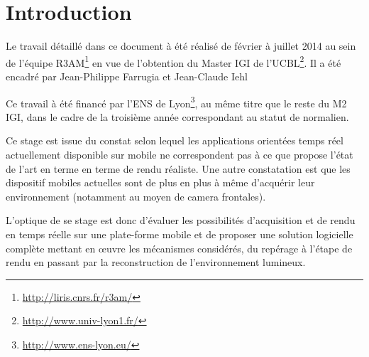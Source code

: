 \documentclass[10pt,a4paper,twoside, twocolumn]{report}
\newcommand*{\rootPath}{../}
\begin{document}
{}
\chapter*{Introduction}

Le travail détaillé dans ce document à été réalisé de février à juillet 2014 au sein de l'équipe R3AM\footnote{\url{http://liris.cnrs.fr/r3am/}} en vue de l’obtention du Master IGI de l'UCBL\footnote{\url{http://www.univ-lyon1.fr/}}. Il a été encadré par Jean-Philippe Farrugia et Jean-Claude Iehl

Ce travail à été financé par l'ENS de Lyon\footnote{\url{http://www.ens-lyon.eu/}}, au même titre que le reste du M2 IGI, dans le cadre de la troisième année correspondant au statut de normalien.

Ce stage est issue du constat selon lequel les applications orientées temps réel actuellement disponible sur mobile ne correspondent pas à ce que propose l'état de l'art en terme en terme de rendu réaliste. Une autre constatation est que les dispositif mobiles actuelles sont de plus en plus à même d’acquérir leur environnement (notamment au moyen de camera frontales).

L'optique de se stage est donc d'évaluer les possibilités d'acquisition et de rendu en temps réelle sur une plate-forme mobile et de proposer une solution logicielle complète mettant en œuvre les mécanismes considérés, du repérage à l'étape de rendu en passant par la reconstruction de l'environnement lumineux.

\ifstandalone
	
	
\fi
\end{document}
